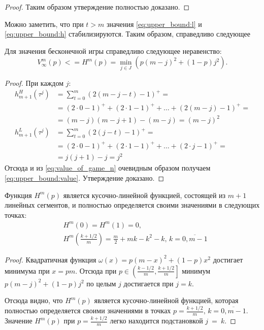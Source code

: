 \begin{proof}
Таким образом утверждение полностью доказано.
\end{proof}

Можно заметить, что при $ t > m $ значения \eqref{eq:upper_bound:l} и \eqref{eq:upper_bound:h} стабилизируются. Таким образом, справедливо следующее

\begin{utver}
Для значения бесконечной игры справедливо следующее неравенство:
\begin{equation}
\label{eq:upper_bound:value}
V_\infty^m(p) 
<= 
H^m(p) = \min_{j \in J}
    (p(m-j)^2 + (1-p)j^2).
\end{equation}
\end{utver}
\begin{proof}
При каждом $ j $:
\begin{align*}
h_{m+1}^H(\tau^j) 
&= \sum_{t=0}^m (2(m-j-t)-1)^+ = \\
&= (2 \cdot 0 - 1)^+ + (2 \cdot 1 - 1)^+ + \ldots + (2(m-j) - 1)^+ = \\
&= (m-j)(m-j+1) - (m-j) = (m-j)^2
\\
h_{m+1}^L(\tau^j)
&= \sum_{t=0}^m (2(j-t)-1)^+ = \\
&= (2 \cdot 0 - 1)^+ + (2 \cdot 1 - 1)^+ + \ldots + (2 \cdot j - 1)^+ = \\
&= j(j+1) - j = j^2
\end{align*}
Отсюда и из \eqref{eq:value_of_game_n} очевидным образом получаем \eqref{eq:upper_bound:value}. Утверждение доказано.
\end{proof}

\begin{lemma}
\label{lemma:upper_bound:function}
Функция $ H^m(p) $ является кусочно-линейной функцией, состоящей из $ m + 1 $ линейных сегментов, и полностью определяется своими значениями в следующих точках:
\begin{eqnarray*}
& H^m(0) = H^m(1) = 0, \\
& H^m\left(\frac{k+1/2}{m}\right) 
    = \frac{m}{2} + mk - k^2 - k, 
        \, k = \overline{0, m - 1}
\end{eqnarray*}
\end{lemma}
\begin{proof}
Квадратичная функция $ \omega(x) = p(m-x)^2 + (1-p)x^2 $ достигает минимума при $ x = pm $. 
Отсюда при $ p \in \left( \frac{k - 1/2}{m}, \frac{k+1/2}{m} \right] $ минимум $ p(m-j)^2 + (1-p)j^2 $ по целым $ j $ достигается при $ j = k $.
 
Отсюда видно, что $ H^m(p) $ является кусочно-линейной функцией, которая полностью определяется своими значениями в точках $ p = \frac{k+1/2}{m}, \, k = \overline{0, m-1} $. 
Значение $ H^m(p) $ при $ p = \frac{k+1/2}{m} $ легко находится подстановкой $ j~=~k $.
\end{proof}